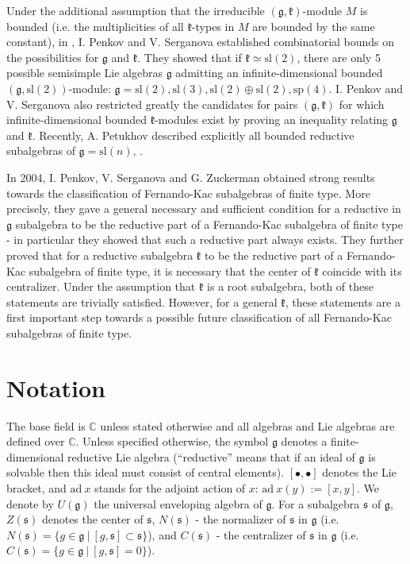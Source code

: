 \documentclass[12pt]{report}
\newcommand {\CC} {\mathbb {C}}
\newcommand{\sS}{\mathfrak{s}}
\newcommand{\kk}{\mathfrak{k}}
\newcommand{\gG}{\mathfrak{g}}
\newcommand{\sL}{\mathrm{sl}}
\newcommand{\sP}{\mathrm{sp}}
\newcommand{\ad}{\mathrm{ad~}}
\def\nsimeq{\hbox{$\simeq${\raise1.05pt\hbox{\kern -0.55em $/$}}\ }}
\begin{document}
Under the additional assumption that the irreducible $(\gG,\kk)$-module $M$ is bounded (i.e. the multiplicities of all $\kk$-types in $M$ are bounded by the same constant), in \cite{PS:Bounded}, I. Penkov and V. Serganova established combinatorial bounds on the possibilities for $\gG$ and $\kk$. They showed that if $\kk\simeq \sL(2)$, there are only 5 possible semisimple  Lie algebras $\gG$ admitting an infinite-dimensional bounded $(\gG,\sL(2))$-module: $\gG=\sL(2),\sL(3),\sL(2)\oplus\sL(2),\sP(4)$. I. Penkov and V. Serganova also restricted greatly the candidates for pairs $(\gG,\kk)$ for which infinite-dimensional bounded $\kk$-modules exist by proving an inequality relating $\gG$ and $\kk$. Recently, A. Petukhov described explicitly all bounded reductive subalgebras of $\gG=\sL(n)$, \cite{Petukhov:boundedRedSAssl(n)}.


In 2004, I. Penkov, V. Serganova and G. Zuckerman obtained strong results towards the classification of Fernando-Kac subalgebras of finite type. More precisely, they gave a general necessary and sufficient condition for a reductive in $\gG$ subalgebra to be the reductive part of a Fernando-Kac subalgebra of finite type - in particular they showed that such a reductive part always exists. They further proved that for a reductive subalgebra $\kk$ to be the reductive part of a Fernando-Kac subalgebra of finite type, it is necessary that the center of $\kk$ coincide with its centralizer. Under the assumption that $\kk$ is a root subalgebra, both of these statements are trivially satisfied. However, for a general $\kk$, these statements are a first important step towards a possible future classification of all Fernando-Kac subalgebras of finite type.


\section{Notation}
The base field is $\CC$ unless stated otherwise and all algebras and Lie algebras are defined over $\CC$. Unless specified otherwise, the symbol $\gG$ denotes a finite-dimensional reductive Lie algebra (``reductive'' means that if an ideal of $\gG$ is solvable then this ideal must consist of central elements). $[\bullet,\bullet]$ denotes the Lie bracket, and $\ad x$ stands for the adjoint action of $x$: $\ad x (y):=[x,y]$. We denote by  $U(\gG)$ the universal enveloping algebra of $\gG$. For a subalgebra $\sS$ of $\gG$, $Z(\sS)$ denotes the center of $\sS$, $N(\sS)$ - the normalizer of $\sS$ in $\gG$ (i.e. $N(\sS)=\{g\in\gG~|~[g,\sS]\subset\sS\}$), and $C(\sS)$ - the centralizer of $\sS$ in $\gG$ (i.e. $C(\sS)=\{g\in\gG~|~[g,\sS]=0\}$). 
\end{document}
